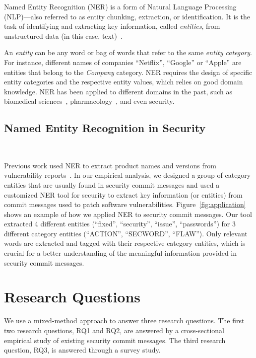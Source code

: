 Named Entity Recognition (NER) is a form of
Natural Language Processing (NLP)---also referred to as entity chunking, extraction, or identification. It is the task of identifying and extracting key information, called \emph{entities}, from unstructured data (in this case, text)~\cite{9039685, mikheev-etal-1999-named, lample-etal-2016-neural}.

An \emph{entity} can be any word or bag of words that refer to the same \emph{entity category}. For instance, different names of companies ``Netflix'', ``Google'' or ``Apple'' are entities that belong to the \emph{Company} category. 
NER requires the design of specific entity categories and the respective entity values, which relies on good domain knowledge. 
NER has been applied to different domains in the past, such as biomedical sciences~\cite{hakala-pyysalo-2019-biomedical}, pharmacology~\cite{gonzalez-agirre-etal-2019-pharmaconer}, and even security. 

\subsection{Named Entity Recognition in Security}~\label{sec:ner}

Previous work used NER to extract product names and versions from vulnerability reports~\cite{10.5555/3361338.3361399}. In our empirical analysis, we designed a group of category entities that are usually found in security commit messages and used a customized NER tool for security to extract key information (or entities) from commit messages used to patch software vulnerabilities.
Figure~\ref{fig:application}
shows an example of how we applied NER to security commit messages. Our tool extracted 4 different entities (``fixed'', ``security'', ``issue'', ``passwords'') for 3 different category entities (``ACTION'', ``SECWORD'', ``FLAW''). Only relevant words are extracted and tagged with their respective category entities, which is crucial for a  better understanding of the meaningful information provided in security commit messages.


\section{Research Questions}\label{sec:research_questions}

We use a mixed-method approach to answer three research questions. The first two research questions, RQ1 and RQ2, are answered by a cross-sectional empirical study of existing security commit messages. The third research question, RQ3, is answered through a survey study. 

